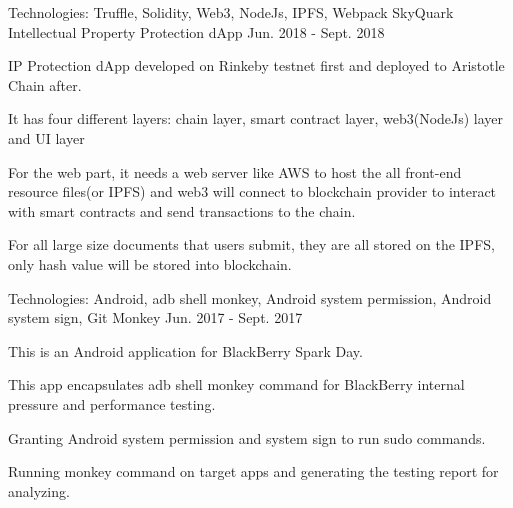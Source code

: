 \begin{cventries}

 
  \cventry
    {Technologies: \quad Truffle, Solidity, Web3, NodeJs, IPFS, Webpack
    }
    {SkyQuark Intellectual Property Protection dApp}
    {}
    {Jun. 2018 - Sept. 2018}
    {
      \begin{cvitems}
        \item {IP Protection dApp developed on Rinkeby testnet first and deployed to Aristotle Chain after.}
        \item {It has four different layers: chain layer, smart contract layer, web3(NodeJs) layer and UI layer}
        \item {For the web part, it needs a web server like AWS to host the all front-end resource files(or IPFS) and web3 will connect to blockchain provider to interact with smart contracts and send transactions to the chain.}
        \item {For all large size documents that users submit, they are all stored on the IPFS, only hash value will be stored into blockchain.}
      \end{cvitems}
    }

  \cventry
    {Technologies: \quad Android, adb shell monkey, Android system permission, Android system sign, Git}
    {Monkey}
    {}
    {Jun. 2017 - Sept. 2017}
    {
      \begin{cvitems}
        \item {This is an Android application for BlackBerry Spark Day.}
        \item {This app encapsulates adb shell monkey command for BlackBerry internal pressure and performance testing.}
        \item {Granting Android system permission and system sign to run sudo commands.}
        \item {Running monkey command on target apps and generating the testing report for analyzing.}
      \end{cvitems}
    }
  

\end{cventries}
